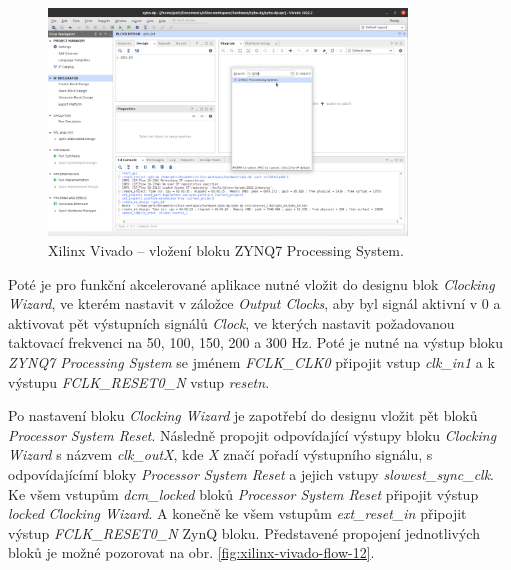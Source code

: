 \documentclass[a4paper, twoside, 11pt]{article}
\begin{document}
		\begin{figure}[htbp!]
			\centering
			\includegraphics[width=0.85\textwidth]{src/png/xilinx-vivado-flow/xilinx-vivado-flow-07.png}
			\caption{Xilinx Vivado – vložení bloku ZYNQ7 Processing System.}
			\label{fig:xilinx-vivado-flow-07}
		\end{figure}


		Poté je pro funkční akcelerované aplikace nutné vložit do designu blok \textit{Clocking Wizard}, ve kterém nastavit v záložce \textit{Output Clocks}, aby byl signál aktivní v 0 a aktivovat pět výstupních signálů \textit{Clock}, ve kterých nastavit požadovanou taktovací frekvenci na 50, 100, 150, 200 a 300 Hz. Poté je nutné na výstup bloku \textit{ZYNQ7 Processing System} se jménem \textit{FCLK\_CLK0} připojit vstup \textit{clk\_in1} a k výstupu \textit{FCLK\_RESET0\_N} vstup \textit{resetn}.\par
		Po nastavení bloku \textit{Clocking Wizard} je zapotřebí do designu vložit pět bloků \textit{Processor System Reset}. Následně propojit odpovídající výstupy bloku \textit{Clocking Wizard} s názvem \textit{clk\_outX}, kde \textit{X} značí pořadí výstupního signálu, s odpovídajícímí bloky \textit{Processor System Reset} a jejich vstupy \textit{slowest\_sync\_clk}. Ke všem vstupům \textit{dcm\_locked} bloků \textit{Processor System Reset} připojit výstup \textit{locked} \textit{Clocking Wizard}. A konečně ke všem vstupům \textit{ext\_reset\_in} připojit výstup \textit{FCLK\_RESET0\_N} ZynQ bloku. Představené propojení jednotlivých bloků je možné pozorovat na obr. \ref{fig:xilinx-vivado-flow-12}.
\end{document}
